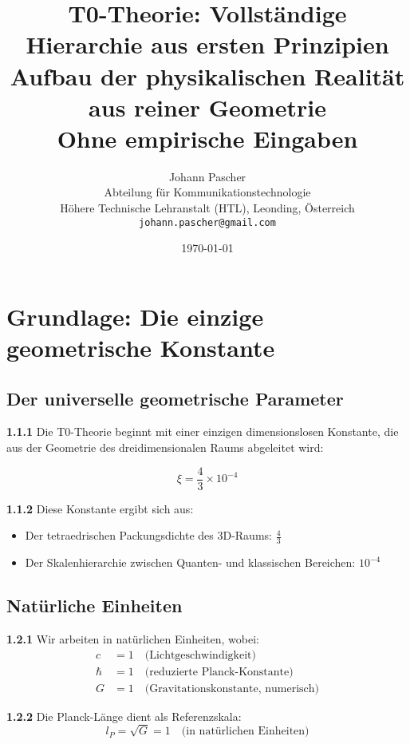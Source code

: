 \documentclass[12pt,a4paper]{article}
\title{\textbf{T0-Theorie: Vollständige Hierarchie aus ersten Prinzipien}\\[0.5cm]
	\large Aufbau der physikalischen Realität aus reiner Geometrie\\[0.3cm]
	\normalsize Ohne empirische Eingaben}
\author{Johann Pascher\\
	Abteilung für Kommunikationstechnologie\\
	Höhere Technische Lehranstalt (HTL), Leonding, Österreich\\
	\texttt{johann.pascher@gmail.com}}
\date{\today}
\newcommand{\lP}{l_P}
\newcommand{\xipar}{\xi}
\begin{document}
	\maketitle
	\tableofcontents
	\newpage
	
	\section{Grundlage: Die einzige geometrische Konstante}
	
	\subsection{Der universelle geometrische Parameter}
	
	\noindent \textbf{1.1.1} Die T0-Theorie beginnt mit einer einzigen dimensionslosen Konstante, die aus der Geometrie des dreidimensionalen Raums abgeleitet wird:
	
	\begin{keyresult}
		\begin{equation}
			\boxed{\xipar = \frac{4}{3} \times 10^{-4}}
		\end{equation}
	\end{keyresult}
	
	\noindent \textbf{1.1.2} Diese Konstante ergibt sich aus:
	\begin{itemize}
		\item Der tetraedrischen Packungsdichte des 3D-Raums: $\frac{4}{3}$
		\item Der Skalenhierarchie zwischen Quanten- und klassischen Bereichen: $10^{-4}$
	\end{itemize}
	
	\subsection{Natürliche Einheiten}
	
	\noindent \textbf{1.2.1} Wir arbeiten in natürlichen Einheiten, wobei:
	\begin{align}
		c &= 1 \quad \text{(Lichtgeschwindigkeit)} \\
		\hbar &= 1 \quad \text{(reduzierte Planck-Konstante)} \\
		G &= 1 \quad \text{(Gravitationskonstante, numerisch)}
	\end{align}
	
	\noindent \textbf{1.2.2} Die Planck-Länge dient als Referenzskala:
	\begin{equation}
		\lP = \sqrt{G} = 1 \quad \text{(in natürlichen Einheiten)}
	\end{equation}
	
\end{document}
